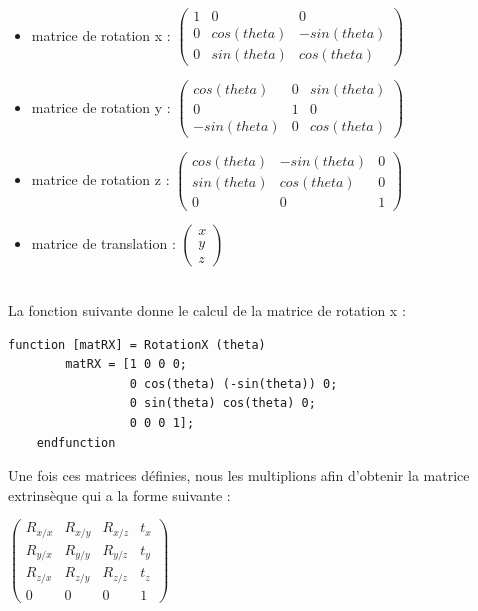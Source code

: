 \documentclass[a4paper,11pt]{article}
\begin{document}
  \begin{itemize}
   \item matrice de rotation x : 
    $\begin{pmatrix}
      1 & 0 & 0\\
      0 & cos(theta) & -sin(theta)\\
      0 & sin(theta) & cos(theta)
    \end{pmatrix}$
      
    \item matrice de rotation y : 
      $\begin{pmatrix}
	cos(theta) & 0 & sin(theta)\\
	0 & 1 & 0\\
	-sin(theta) & 0 & cos(theta)
      \end{pmatrix}$
	
    \item matrice de rotation z : 
      $\begin{pmatrix}
	cos(theta) & -sin(theta) & 0\\
	sin(theta) & cos(theta) & 0\\
	0 & 0 & 1
      \end{pmatrix}$
	
    \item matrice de translation : 
      $\begin{pmatrix}
	x\\
	y\\
	z
    \end{pmatrix}$
  \end{itemize}
  \ \\
  La fonction suivante donne le calcul de la matrice de rotation x :
  \begin{lstlisting}[caption=Fonction qui calcule la rotation sur X]
    function [matRX] = RotationX (theta)
        matRX = [1 0 0 0; 
                 0 cos(theta) (-sin(theta)) 0; 
                 0 sin(theta) cos(theta) 0; 
                 0 0 0 1];
    endfunction
  \end{lstlisting}

  Une fois ces matrices définies, nous les multiplions afin d'obtenir la matrice
  extrinsèque qui a la forme suivante :\\
  \begin{center}
    $\begin{pmatrix}
      R_{x/x} & R_{x/y} & R_{x/z} & t_{x}\\
      R_{y/x} & R_{y/y} & R_{y/z} & t_{y}\\
      R_{z/x} & R_{z/y} & R_{z/z} & t_{z}\\
      0 & 0 & 0 & 1
      \end{pmatrix}$
  \end{center}
  
\end{document}
